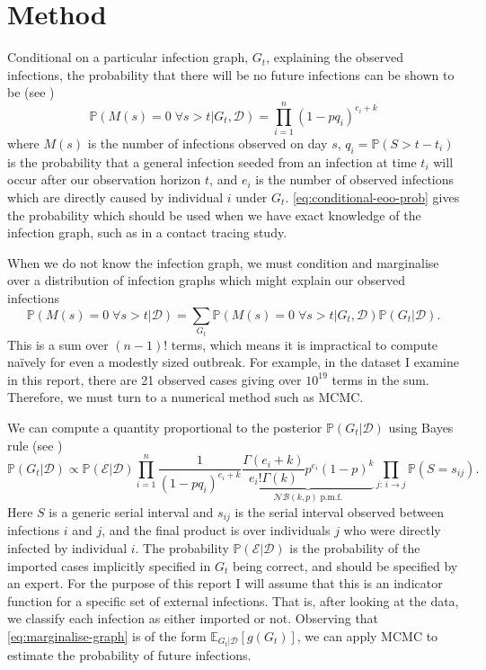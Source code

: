 \documentclass{article}
\begin{document}
\section{Method}\label{sec:method}
Conditional on a particular infection graph, \(G_t\), explaining the observed infections, the probability that there will be no future infections can be shown to be (see )
\begin{equation}\label{eq:conditional-eoo-prob}
    \mathbb{P}(M(s) = 0 \;\forall s > t | G_t, \mathcal{D}) = \prod_{i=1}^n \left(1 - p q_i\right)^{e_i + k}
\end{equation}
where \(M(s)\) is the number of infections observed on day \(s\), \(q_i = \mathbb{P}(S > t-t_i)\) is the probability that a general infection seeded from an infection at time \(t_i\) will occur after our observation horizon \(t\), and \(e_i\) is the number of observed infections which are directly caused by individual \(i\) under \(G_t\). \autoref{eq:conditional-eoo-prob} gives the probability which should be used when we have exact knowledge of the infection graph, such as in a contact tracing study.

When we do not know the infection graph, we must condition and marginalise over a distribution of infection graphs which might explain our observed infections
\begin{equation}\label{eq:marginalise-graph}
    \mathbb{P}(M(s) = 0 \;\forall s > t | \mathcal{D}) = \sum_{G_t} \mathbb{P}(M(s) = 0 \;\forall s > t | G_t, \mathcal{D}) \mathbb{P}(G_t | \mathcal{D}).
\end{equation}
This is a sum over \((n-1)!\) terms, which means it is impractical to compute naïvely for even a modestly sized outbreak. For example, in the dataset I examine in this report, there are 21 observed cases giving over \(10^{19}\) terms in the sum. Therefore, we must turn to a numerical method such as MCMC.

We can compute a quantity proportional to the posterior \(\mathbb{P}(G_t | \mathcal{D})\) using Bayes rule (see )
\begin{equation}
    \mathbb{P}(G_t | \mathcal{D}) \propto \mathbb{P}(\mathcal{E} | \mathcal{D}) \prod_{i=1}^n \frac{1}{(1-pq_i)^{e_i + k}} \underbrace{\frac{\Gamma(e_i + k)}{e_i! \Gamma(k)} p^{e_i} (1-p)^k}_{\mathcal{NB}(k, p) \;\text{p.m.f.}} \prod_{j:\, i \to j} \mathbb{P}(S = s_{ij}).
\end{equation}
Here \(S\) is a generic serial interval and \(s_{ij}\) is the serial interval observed between infections \(i\) and \(j\), and the final product is over individuals \(j\) who were directly infected by individual \(i\). The probability \(\mathbb{P}(\mathcal{E}|\mathcal{D})\) is the probability of the imported cases implicitly specified in \(G_t\) being correct, and should be specified by an expert. For the purpose of this report I will assume that this is an indicator function for a specific set of external infections. That is, after looking at the data, we classify each infection as either imported or not. Observing that \autoref{eq:marginalise-graph} is of the form \(\mathbb{E}_{G_t | \mathcal{D}}[g(G_t)]\), we can apply MCMC to estimate the probability of future infections.
\end{document}
